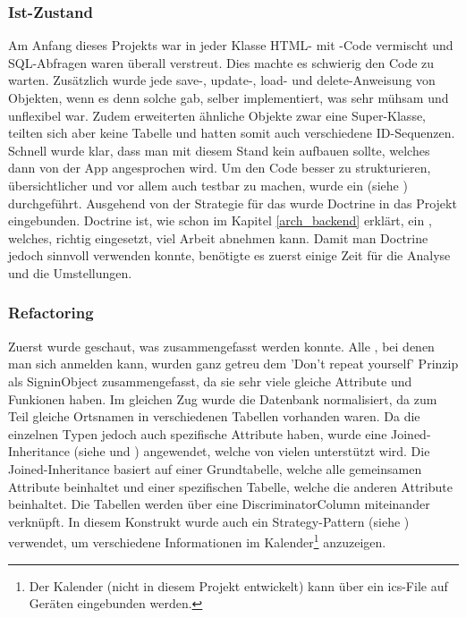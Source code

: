 \subsubsection{Ist-Zustand}
Am Anfang dieses Projekts war in jeder Klasse HTML- mit -Code vermischt und SQL-Abfragen waren überall verstreut. Dies machte es schwierig den Code zu warten. Zusätzlich wurde jede save-, update-, load- und delete-Anweisung von Objekten, wenn es denn solche gab, selber implementiert, was sehr mühsam und unflexibel war. Zudem erweiterten ähnliche Objekte zwar eine Super-Klasse, teilten sich aber keine Tabelle und hatten somit auch verschiedene ID-Sequenzen.\\

Schnell wurde klar, dass man mit diesem Stand kein  aufbauen sollte, welches dann von der App angesprochen wird. Um den Code besser zu strukturieren, übersichtlicher und vor allem auch testbar zu machen, wurde ein  (siehe \cite{feathers2004working}) durchgeführt. Ausgehend von der Strategie für das  wurde Doctrine in das Projekt eingebunden. Doctrine ist, wie schon im Kapitel \ref{arch_backend} erklärt, ein , welches, richtig eingesetzt, viel Arbeit abnehmen kann. Damit man Doctrine jedoch sinnvoll verwenden konnte, benötigte es zuerst einige Zeit für die Analyse und die Umstellungen.

\subsubsection{Refactoring}
Zuerst wurde geschaut, was zusammengefasst werden konnte. Alle , bei denen man sich anmelden kann, wurden ganz getreu dem 'Don’t repeat yourself' Prinzip als SigninObject zusammengefasst, da sie sehr viele gleiche Attribute und Funkionen haben. Im gleichen Zug wurde die Datenbank normalisiert, da zum Teil gleiche Ortsnamen in verschiedenen Tabellen vorhanden waren. Da die einzelnen Typen jedoch auch spezifische Attribute haben, wurde eine Joined-Inheritance (siehe \cite{inheritance_java} und \cite{inheritance_doctrine}) angewendet, welche von vielen  unterstützt wird. Die Joined-Inheritance basiert auf einer Grundtabelle, welche alle gemeinsamen Attribute beinhaltet und einer spezifischen Tabelle, welche die anderen Attribute beinhaltet. Die Tabellen werden über eine DiscriminatorColumn miteinander verknüpft. In diesem Konstrukt wurde auch ein Strategy-Pattern (siehe \cite{gof_book}) verwendet, um verschiedene Informationen im Kalender\footnote{Der Kalender (nicht in diesem Projekt entwickelt) kann über ein ics-File auf Geräten eingebunden werden.} anzuzeigen.\\

